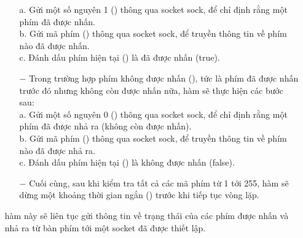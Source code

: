 \begin{itemize}
\begin{itemize}
    a. Gửi một số nguyên 1 (\textbf{}) thông qua socket sock, để chỉ định rằng một phím đã được nhấn.\\
    b. Gửi mã phím (\textbf{}) thông qua socket sock, để truyền thông tin về phím nào đã được nhấn.\\
    c. Đánh dấu phím hiện tại (\textbf{}) là đã được nhấn (true).\\
    \item[$-$] Trong trường hợp phím không được nhấn (\textbf{\ttfamily{keyCode])}}), tức là phím đã được nhấn trước đó nhưng không còn được nhấn nữa, hàm sẽ thực hiện các bước sau:\\
    a. Gửi một số nguyên 0 (\textbf{}) thông qua socket sock, để chỉ định rằng một phím đã được nhả ra (không còn được nhấn).\\
    b. Gửi mã phím (\textbf{}) thông qua socket sock, để truyền thông tin về phím nào đã được nhả ra.\\
    c. Đánh dấu phím hiện tại (\textbf{}) là không được nhấn (false).
    \item[$-$] Cuối cùng, sau khi kiểm tra tất cả các mã phím từ 1 tới 255, hàm sẽ dừng một khoảng thời gian ngắn (\textbf{}) trước khi tiếp tục vòng lặp.
    \end{itemize}
    hàm \textbf{} này sẽ liên tục gửi thông tin về trạng thái của các phím được nhấn và nhả ra từ bàn phím tới một socket đã được thiết lập.\\


\end{itemize}
